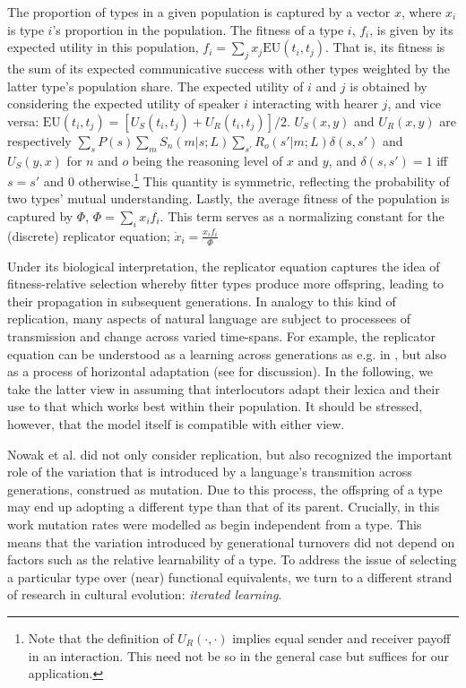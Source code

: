 \documentclass[a4paper]{article}
\begin{document}
The proportion of types in a given population is captured by a vector $x$, where $x_i$ is type $i$'s proportion in the population. The fitness of a type $i$, $f_i$, is given by its expected utility in this population, $f_i = \sum_j x_j \text{EU}(t_i,t_j)$. That is, its fitness is the sum of its expected communicative success with other types weighted by the latter type's population share. The expected utility of $i$ and $j$ is obtained by considering the expected utility of speaker $i$ interacting with hearer $j$, and vice versa: $\text{EU}(t_i,t_j) = [U_S(t_i,t_j) + U_R(t_i,t_j)]/2$. $U_S(x,y)$ and $U_R(x,y)$ are respectively $\sum_s P(s)\sum_m S_n(m|s;L) \sum_{s'} R_o(s'|m;L) \delta(s,s')$ and $U_S(y,x)$ for $n$ and $o$ being the reasoning level of $x$ and $y$, and $\delta(s,s') = 1$ iff $s = s'$ and $0$ otherwise.\footnote{Note that the definition of $U_R(\cdot,\cdot)$ implies equal sender and receiver payoff in an interaction. This need not be so in the general case but suffices for our application.} This quantity is symmetric, reflecting the probability of two types' mutual understanding. Lastly, the average fitness of the population is captured by $\Phi$, $\Phi = \sum_i x_i f_i$. This term serves as a normalizing constant for the (discrete) replicator equation; $\dot{x}_i = \frac{x_i f_i}{\Phi}$ 

Under its biological interpretation, the replicator equation captures the idea of fitness-relative selection whereby fitter types produce more offspring, leading to their propagation in subsequent generations. In analogy to this kind of replication, many aspects of natural language are subject to processees of transmission and change across varied time-spans. For example, the replicator equation can be understood as a learning across generations as e.g. in \citealt{nowak+etal:2002}, but also as a process of horizontal adaptation (see \citealt[\S3.3]{benz+etal:2005b} for discussion). In the following, we take the latter view in assuming that interlocutors adapt their lexica and their use to that which works best within their population. It should be stressed, however, that the model itself is compatible with either view. 

Nowak et al. did not only consider replication, but also recognized the important role of the variation that is introduced by a language's transmition across generations, construed as mutation. Due to this process, the offspring of a type may end up adopting a different type than that of its parent. Crucially, in this work mutation rates were modelled as begin independent from a type. This means that the variation introduced by generational turnovers did not depend on factors such as the relative learnability of a type. To address the issue of selecting a particular type over (near) functional equivalents, we turn to a different strand of research in cultural evolution: {\em iterated learning}. 
\end{document}
